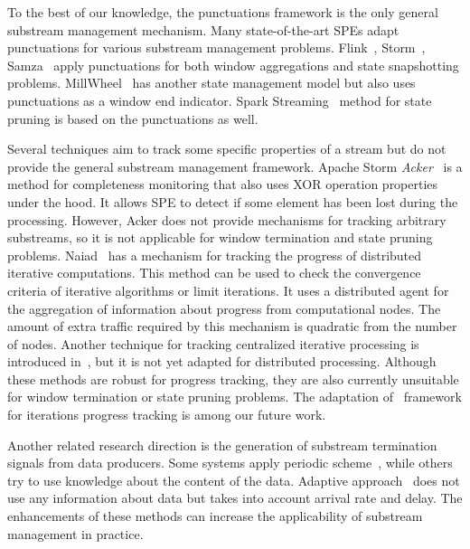 \label {fs-acker-related}

To the best of our knowledge, the punctuations framework is the only general substream management mechanism. Many state-of-the-art SPEs adapt punctuations for various substream management problems. Flink~\cite{Carbone:2017:SMA:3137765.3137777}, Storm~\cite{Toshniwal:2014:STO:2588555.2595641}, Samza~\cite{Noghabi:2017:SSS:3137765.3137770} apply punctuations for both window aggregations and state snapshotting problems. MillWheel~\cite{Akidau:2013:MFS:2536222.2536229} has another state management model but also uses punctuations as a window end indicator. Spark Streaming~\cite{Zaharia:2012:DSE:2342763.2342773} method for state pruning is based on the punctuations as well.

Several techniques aim to track some specific properties of a stream but do not provide the general substream management framework. Apache Storm {\em Acker}~\cite{apache:storm:acker} is a method for completeness monitoring that also uses XOR operation properties under the hood. It allows SPE to detect if some element has been lost during the processing. However, Acker does not provide mechanisms for tracking arbitrary substreams, so it is not applicable for window termination and state pruning problems. Naiad~\cite{Murray:2013:NTD:2517349.2522738} has a mechanism for tracking the progress of distributed iterative computations. This method can be used to check the convergence criteria of iterative algorithms or limit iterations. It uses a distributed agent for the aggregation of information about progress from computational nodes. The amount of extra traffic required by this mechanism is quadratic from the number of nodes. Another technique for tracking centralized iterative processing is introduced in~\cite{chandramouli2014trill}, but it is not yet adapted for distributed processing. Although these methods are robust for progress tracking, they are also currently unsuitable for window termination or state pruning problems. The adaptation of \tracker\ framework for iterations progress tracking is among our future work.

Another related research direction is the generation of substream termination signals from data producers. Some systems apply periodic scheme~\cite{Akidau:2013:MFS:2536222.2536229, Akidau:2015:DMP:2824032.2824076}, while others try to use knowledge about the content of the data. Adaptive approach~\cite{awad2019adaptive} does not use any information about data but takes into account arrival rate and delay. The enhancements of these methods can increase the applicability of substream management in practice.

